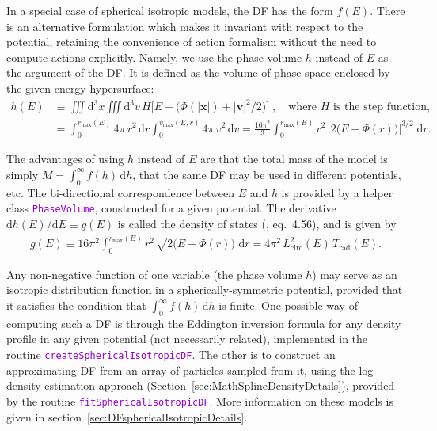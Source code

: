\documentclass[12pt]{article}
\newcommand{\ttt}[1]{\textcolor{darkviolet}{\texttt{#1}}}
\renewcommand{\d}{\mathrm{d}}
\newcommand{\bv}{\boldsymbol{v}}
\newcommand{\bx}{\boldsymbol{x}}
\begin{document}
In a special case of spherical isotropic models, the DF has the form $f(E)$. There is an alternative formulation which makes it invariant with respect to the potential, retaining the convenience of action formalism without the need to compute actions explicitly. Namely, we use the phase volume $h$ instead of $E$ as the argument of the DF. It is defined as the volume of phase space enclosed by the given energy hypersurface:
\begin{align*}
h(E) &\equiv \iiint \d ^3x \iiint \d ^3v\, H\Big[E - \big(\Phi(|\bx|)+|\bv|^2/2\big)\Big] \;,\quad
\mbox{where $H$ is the step function,} \\
&= \int_0^{r_\mathrm{max}(E)} 4\pi\,r^2\,\d r \int_0^{v_\mathrm{max}(E,r)} 4\pi\, v^2\,\d v =
\frac{16\pi^2}{3} \int_0^{r_\mathrm{max}(E)} r^2\, \Big[2\big(E-\Phi(r)\big)\Big]^{3/2}\;\d r.
\end{align*}

The advantages of using $h$ instead of $E$ are that the total mass of the model is simply $M=\int_0^\infty f(h)\,\d h$, that the same DF may be used in different potentials, etc. The bi-directional correspondence between $E$ and $h$ is provided by a helper class \ttt{PhaseVolume}, constructed for a given potential. The derivative $\d h(E)/\d E \equiv g(E)$ is called the density of states (\cite{BinneyTremaine}, eq.~4.56), and is given by
\begin{align*}
g(E) \equiv 16\pi^2 \int_0^{r_\mathrm{max}(E)} r^2\, \sqrt{2\big(E-\Phi(r)\big)}\;\d r 
= 4\pi^2\,L^2_\mathrm{circ}(E)\,T_\mathrm{rad}(E).
\end{align*}

Any non-negative function of one variable (the phase volume $h$) may serve as an isotropic distribution function in a spherically-symmetric potential, provided that it satisfies the condition that $\int_0^\infty f(h)\, \d h$ is finite. 
One possible way of computing such a DF is through the Eddington inversion formula for any density profile in any given potential (not necessarily related), implemented in the routine \ttt{createSphericalIsotropicDF}. The other is to construct an approximating DF from an array of particles sampled from it, using the log-density estimation approach (Section~\ref{sec:MathSplineDensityDetails}), provided by the routine \ttt{fitSphericalIsotropicDF}.
More information on these models is given in section~\ref{sec:DFsphericalIsotropicDetails}.
\end{document}

